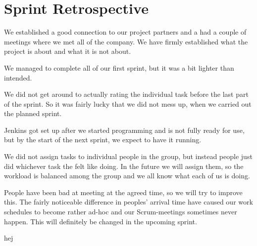 \section{Sprint Retrospective}

We established a good connection to our project partners and a had a
couple of meetings where we met all of the company. We have firmly
established what the project is about and what it is not about. 

We managed to complete all of our first sprint, but it was a bit
lighter than intended.

We did not get around to actually rating the individual task before the
last part of the sprint. So it was fairly lucky that we did not mess up,
when we carried out the planned sprint. 

Jenkins got set up after we started programming and is not fully ready
for use, but by the start of the next sprint, we expect to have it
running.

We did not assign tasks to individual people in the group, but instead
people just did whichever task the felt like doing. In the future we will
assign them, so the workload is balanced among the group and we all know
what each of us is doing.

People have been bad at meeting at the agreed time, so we will try to
improve this. The fairly noticeable difference in peoples' arrival
time have caused our work schedules to become rather ad-hoc and our
Scrum-meetings sometimes never happen. This will definitely be changed in
the upcoming sprint.

hej



